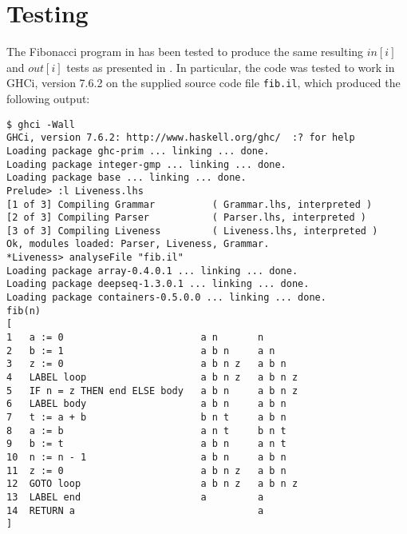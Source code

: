 \section{Testing}\label{section:testing}

The Fibonacci program in \cite[Figure 3.3]{torben} has been tested to produce
the same resulting $in[i]$ and $out[i]$ tests as presented in \cite[Figure
3.5]{torben}. In particular, the code was tested to work in GHCi, version 7.6.2
on the supplied source code file \texttt{fib.il}, which produced the following
output:

\begin{verbatim}
$ ghci -Wall
GHCi, version 7.6.2: http://www.haskell.org/ghc/  :? for help
Loading package ghc-prim ... linking ... done.
Loading package integer-gmp ... linking ... done.
Loading package base ... linking ... done.
Prelude> :l Liveness.lhs 
[1 of 3] Compiling Grammar          ( Grammar.lhs, interpreted )
[2 of 3] Compiling Parser           ( Parser.lhs, interpreted )
[3 of 3] Compiling Liveness         ( Liveness.lhs, interpreted )
Ok, modules loaded: Parser, Liveness, Grammar.
*Liveness> analyseFile "fib.il"
Loading package array-0.4.0.1 ... linking ... done.
Loading package deepseq-1.3.0.1 ... linking ... done.
Loading package containers-0.5.0.0 ... linking ... done.
fib(n)
[
1   a := 0                        a n       n
2   b := 1                        a b n     a n
3   z := 0                        a b n z   a b n
4   LABEL loop                    a b n z   a b n z
5   IF n = z THEN end ELSE body   a b n     a b n z
6   LABEL body                    a b n     a b n
7   t := a + b                    b n t     a b n
8   a := b                        a n t     b n t
9   b := t                        a b n     a n t
10  n := n - 1                    a b n     a b n
11  z := 0                        a b n z   a b n
12  GOTO loop                     a b n z   a b n z
13  LABEL end                     a         a
14  RETURN a                                a
]
\end{verbatim}

